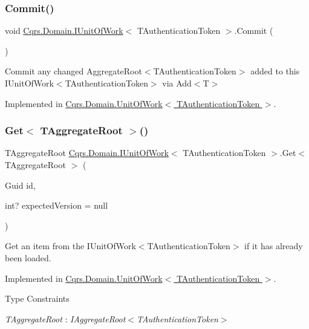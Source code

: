 \subsubsection{\texorpdfstring{Commit()}{Commit()}}
{\footnotesize\ttfamily void \hyperlink{interfaceCqrs_1_1Domain_1_1IUnitOfWork}{Cqrs.\+Domain.\+I\+Unit\+Of\+Work}$<$ T\+Authentication\+Token $>$.Commit (\begin{DoxyParamCaption}{ }\end{DoxyParamCaption})}



Commit any changed Aggregate\+Root$<$\+T\+Authentication\+Token$>$ added to this I\+Unit\+Of\+Work$<$\+T\+Authentication\+Token$>$ via Add$<$\+T$>$ 



Implemented in \hyperlink{classCqrs_1_1Domain_1_1UnitOfWork_a7401e41dd8ce4457551c252ca6402d31}{Cqrs.\+Domain.\+Unit\+Of\+Work$<$ T\+Authentication\+Token $>$}.

\mbox{\label{interfaceCqrs_1_1Domain_1_1IUnitOfWork_aad3e9f94cbe6941163feb9fe00ddbe06}} 
\subsubsection{\texorpdfstring{Get$<$ T\+Aggregate\+Root $>$()}{Get< TAggregateRoot >()}}
{\footnotesize\ttfamily T\+Aggregate\+Root \hyperlink{interfaceCqrs_1_1Domain_1_1IUnitOfWork}{Cqrs.\+Domain.\+I\+Unit\+Of\+Work}$<$ T\+Authentication\+Token $>$.Get$<$ T\+Aggregate\+Root $>$ (\begin{DoxyParamCaption}\item[{Guid}]{id,  }\item[{int?}]{expected\+Version = {\ttfamily null} }\end{DoxyParamCaption})}



Get an item from the I\+Unit\+Of\+Work$<$\+T\+Authentication\+Token$>$ if it has already been loaded. 



Implemented in \hyperlink{classCqrs_1_1Domain_1_1UnitOfWork_a1e953136c916aee711068813078aed05}{Cqrs.\+Domain.\+Unit\+Of\+Work$<$ T\+Authentication\+Token $>$}.

\begin{Desc}
\item[Type Constraints]\begin{description}
\item[{\em T\+Aggregate\+Root} : {\em I\+Aggregate\+Root$<$T\+Authentication\+Token$>$}]\end{description}
\end{Desc}
